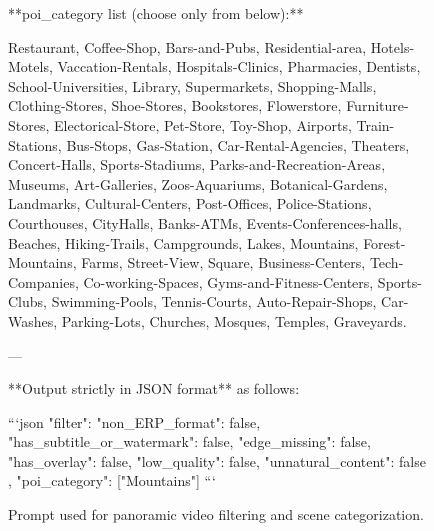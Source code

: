 \begin{figure}[t]
\begin{PromptBox}
**poi_category list (choose only from below):**

Restaurant, Coffee-Shop, Bars-and-Pubs, Residential-area, Hotels-Motels, Vaccation-Rentals, Hospitals-Clinics, Pharmacies, Dentists, School-Universities, Library, Supermarkets, Shopping-Malls, Clothing-Stores, Shoe-Stores, Bookstores, Flowerstore, Furniture-Stores, Electorical-Store, Pet-Store, Toy-Shop, Airports, Train-Stations, Bus-Stops, Gas-Station, Car-Rental-Agencies, Theaters, Concert-Halls, Sports-Stadiums, Parks-and-Recreation-Areas, Museums, Art-Galleries, Zoos-Aquariums, Botanical-Gardens, Landmarks, Cultural-Centers, Post-Offices, Police-Stations, Courthouses, CityHalls, Banks-ATMs, Events-Conferences-halls, Beaches, Hiking-Trails, Campgrounds, Lakes, Mountains, Forest-Mountains, Farms, Street-View, Square, Business-Centers, Tech-Companies, Co-working-Spaces, Gyms-and-Fitness-Centers, Sports-Clubs, Swimming-Pools, Tennis-Courts, Auto-Repair-Shops, Car-Washes, Parking-Lots, Churches, Mosques, Temples, Graveyards.

---

**Output strictly in JSON format** as follows:

```json
{
  "filter": {
    "non_ERP_format": false,
    "has_subtitle_or_watermark": false,
    "edge_missing": false,
    "has_overlay": false,
    "low_quality": false,
    "unnatural_content": false
  },
  "poi_category": ["Mountains"]
}
```
\end{PromptBox}
\caption{
    Prompt used for panoramic video filtering and scene categorization.
}\label{fig:filter}
\end{figure}
